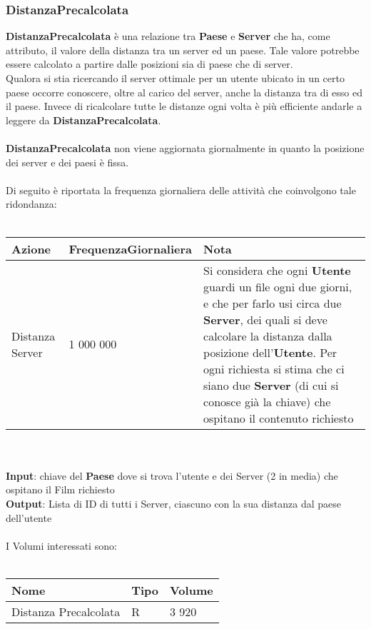 \documentclass{article}
\begin{document}
\subsubsection{DistanzaPrecalcolata}
\textbf{DistanzaPrecalcolata} è una relazione tra \textbf{Paese} e \textbf{Server} che ha, come attributo, il valore della distanza tra un server ed un paese. Tale valore potrebbe essere calcolato a partire dalle posizioni sia di paese che di server. \\
Qualora si stia ricercando il server ottimale per un utente ubicato in un certo paese occorre conoscere, oltre al carico del server, anche la distanza tra di esso ed il paese. Invece di ricalcolare tutte le distanze ogni volta è più efficiente andarle a leggere da \textbf{DistanzaPrecalcolata}. \\ \\
\textbf{DistanzaPrecalcolata} non viene aggiornata giornalmente in quanto la posizione dei server e dei paesi è fissa.
\\ \\
Di seguito è riportata la frequenza giornaliera delle attività che coinvolgono tale ridondanza: \\ \\
\begin{tabular}{|C{2.2cm}|C{3.8cm}|C{4.4cm}|}
\hline
    \textbf{Azione} & \textbf{FrequenzaGiornaliera} & \textbf{Nota} \\
\hline
Distanza Server & 1 000 000 & Si considera che ogni \textbf{Utente} guardi un file ogni due giorni, e che per farlo usi circa due \textbf{Server}, dei quali si deve calcolare la distanza dalla posizione dell'\textbf{Utente}. Per ogni richiesta si stima che ci siano due \textbf{Server} (di cui si conosce già la chiave) che ospitano il contenuto richiesto \\
\hline
\end{tabular}
\\ \\ 
\textbf{Input}: chiave del \textbf{Paese} dove si trova l'utente e dei Server (2 in media) che ospitano il Film richiesto\\
\textbf{Output}: Lista di ID di tutti i Server, ciascuno con la sua distanza dal paese dell'utente
\\ \\
%
%
%
%
%
%
%
%
I Volumi interessati sono: \\ \\ 
\begin{tabular}{|C{2.6cm}|C{2.6cm}|C{2.6cm}|}
\hline
    \textbf{Nome} & \textbf{Tipo} & \textbf{Volume} \\
\hline
 Distanza Precalcolata & R & 3 920 \\
\hline
\end{tabular}
\end{document}
